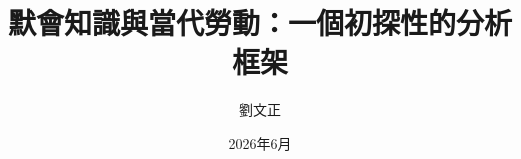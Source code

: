 \documentclass[12pt]{article}
\begin{document}
\title{默會知識與當代勞動：一個初探性的分析框架}
\author{劉文正}
\date{2026年6月}
\maketitle

\tableofcontents





\printbibliography
\end{document}
